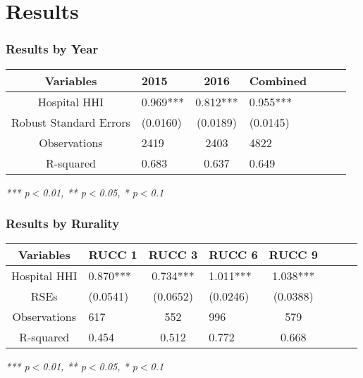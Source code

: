 \documentclass{beamer}
\begin{document}
\section[Results]{Results}

\begin{frame}
\frametitle{Results by Year}
\begin{table}
\begin{tabular}{c l c l c l c}
\toprule
\textbf{Variables} & \textbf{2015} & \textbf{2016} & \textbf{Combined}\\
\midrule
Hospital HHI & 0.969*** & 0.812*** & 0.955*** \\
Robust Standard Errors & (0.0160) & (0.0189) & (0.0145) \\
Observations & 2419 & 2403 & 4822 \\
R-squared & 0.683 & 0.637 & 0.649 \\
\bottomrule
\end{tabular}
\textit{*** p$<$0.01, ** p$<$0.05, * p$<$0.1}
\end{table}
\end{frame}


\begin{frame}
\frametitle{Results by Rurality}
\begin{table}
\begin{tabular}{c l c l c l c | c}
\toprule
\textbf{Variables} & \textbf{RUCC 1} & \textbf{RUCC 3} & \textbf{RUCC 6} & \textbf{RUCC 9}\\
\midrule
Hospital HHI & 0.870*** & 0.734*** & 1.011*** & 1.038***\\
RSEs & (0.0541) & (0.0652) & (0.0246) & (0.0388) \\
Observations & 617 & 552 & 996 & 579 \\
R-squared & 0.454 & 0.512 & 0.772 & 0.668 \\
\bottomrule
\end{tabular}
\textit{*** p$<$0.01, ** p$<$0.05, * p$<$0.1}
\end{table}
\end{frame}

\end{document}
